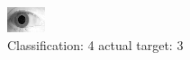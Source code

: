 \begin{figure}[h!]
\begin{center}
\includegraphics[width=0.60\columnwidth]{figures/ID1920_class_4_target_3.png}
\end{center}
\caption{ Classification: 4 actual target: 3}
\label{fig:ID1920_class_4_target_3}
\end{figure}
